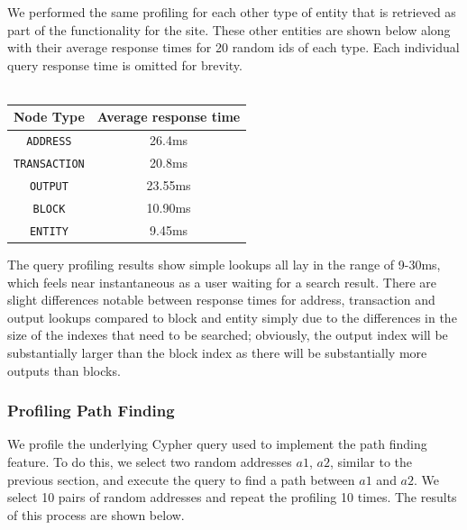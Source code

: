 We performed the same profiling for each other type of entity that is retrieved as part of the functionality for the site. These other entities are shown below along with their average response times for 20 random ids of each type. Each individual query response time is omitted for brevity. 
\\\\
\begin{center}
\begin{tabular}{ |c|c| } 
 \hline
\textbf{Node Type} & \textbf{Average response time} \\\hline
\texttt{ADDRESS} & 26.4ms \\
\texttt{TRANSACTION} & 20.8ms \\
\texttt{OUTPUT} & 23.55ms \\
\texttt{BLOCK} & 10.90ms \\
\texttt{ENTITY} & 9.45ms \\
\hline
\end{tabular}
\end{center}
The query profiling results show simple lookups all lay in the range of 9-30ms, which feels near instantaneous as a user waiting for a search result. There are slight differences notable between response times for address, transaction and output lookups compared to block and entity simply due to the differences in the size of the indexes that need to be searched; obviously, the output index will be substantially larger than the block index as there will be substantially more outputs than blocks. 

\subsubsection{Profiling Path Finding}\label{evaluation:path-finding-profile}
We profile the underlying Cypher query used to implement the path finding feature. To do this, we select two random addresses $a1$, $a2$, similar to the previous section, and execute the query to find a path between $a1$ and $a2$. We select 10 pairs of random addresses and repeat the profiling 10 times. The results of this process are shown below. 

